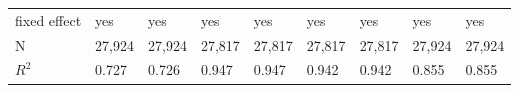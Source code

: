 \begin{tabular}{lllllllll}
\midrule fixed effect        &                                  yes &                                 yes &                                  yes &                                  yes &                                  yes &                                  yes &                                 yes &                                 yes \\
N                            &                               27,924 &                              27,924 &                               27,817 &                               27,817 &                               27,817 &                               27,817 &                              27,924 &                              27,924 \\
$R^2$                        &                                0.727 &                               0.726 &                                0.947 &                                0.947 &                                0.942 &                                0.942 &                               0.855 &                               0.855 \\
\bottomrule
\end{tabular}
